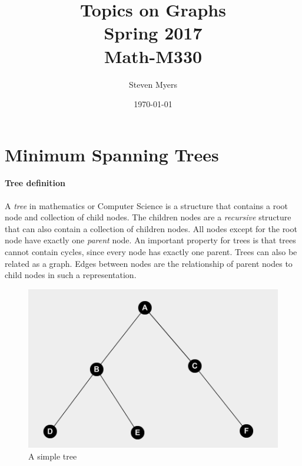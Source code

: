 \documentclass{article}
\begin{document}
\title{Topics on Graphs\\ Spring 2017\\ Math-M330}         %
\author{Steven Myers}        %
\date{\today}          %
\maketitle


\makeatother     %

\pagestyle{plain}

\section*{Minimum Spanning Trees}
\paragraph{Tree definition}
A \textit{tree} in mathematics or Computer Science is a structure that contains a root node and collection of child nodes. The children nodes are a \textit{recursive} structure that can also contain a collection of children nodes. All nodes except for the root node have exactly one \textit{parent} node. An important property for trees is that trees cannot contain cycles, since every node has exactly one parent. Trees can also be related as a graph. Edges between nodes are the relationship of parent nodes to child nodes in such a representation.

\begin{figure}[H]
    \centering
    \includegraphics[width=.6\linewidth, height=.25\textheight]{tree_example}
    \caption{A simple tree}
\end{figure}
\end{document}
